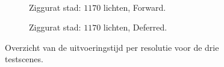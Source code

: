 \begin{figure}[t]
\begin{adjustbox}{minipage=\textwidth, scale=0.55}
\begin{subfigure}[b]{0.8\textwidth}
      \label{fig:ts-resolution-deferred:alley}
    \end{subfigure}
  \end{adjustbox} \\
  \begin{adjustbox}{minipage=\textwidth, scale=0.55}
    \begin{subfigure}[b]{0.8\textwidth}
      \centering
      \def\svgwidth{\textwidth}
      
      \caption{Ziggurat stad: $1170$ lichten, Forward.}
      \label{fig:ts-resolution-forward:city}
    \end{subfigure}
  \end{adjustbox}\hspace{-0.075\textwidth} %
  \begin{adjustbox}{minipage=\textwidth, scale=0.55}
    \begin{subfigure}[b]{0.8\textwidth}
      \centering
      \def\svgwidth{\textwidth}
      
      \caption{Ziggurat stad: $1170$ lichten, Deferred.}
      \label{fig:ts-resolution-deferred:city}
    \end{subfigure}
  \end{adjustbox}
  \caption{Overzicht van de uitvoeringstijd per resolutie voor de drie testscenes.}
  \label{fig:ts-resolution}
\end{figure}

